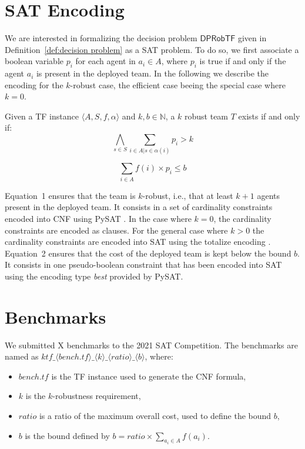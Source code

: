 \documentclass[conference]{IEEEtran}
\newcommand{\dprobtf}{\ensuremath{\mathsf{DPRobTF}}}
\theoremstyle{definition}
\begin{document}
\section{SAT Encoding}

We are interested in formalizing the decision problem \dprobtf{} given in Definition~\ref{def:decision problem}
as a SAT problem.
To do so, we first associate a boolean 
variable $p_i$ for each agent in $a_i \in A$, where $p_i$ is true
if and only if the agent $a_i$ is present in the deployed team.
In the following we describe the encoding for the $k$-robust case, the efficient
case beeing the special case where $k=0$.

Given a TF instance $\langle A, S, f, \alpha\rangle$ and $k, b \in \mathbb{N}$, 
a $k$ robust team $T$ exists if and only if:
\begin{equation}
\bigwedge_{s \in S} \sum_{i \in A | s \in \alpha(i)} p_i > k
\end{equation}

\begin{equation}
\sum_{i \in A} f(i) \times p_i \leq b
\end{equation}

Equation~1 ensures that the team is $k$-robust, i.e., that at least $k + 1$ agents present in the deployed team.
It consists in a set of cardinality constraints encoded into CNF using PySAT \cite{imms-sat18}.
In the case where $k = 0$, the cardinality constraints are encoded as clauses. 
For the general case where $k > 0$ the cardinality constraints are encoded into SAT using
the totalize encoding \cite{BailleuxB03}.
Equation~2 ensures that the cost of the deployed team is kept below the bound $b$.
It consists in one pseudo-boolean constraint
that has been encoded into SAT using the encoding type \textit{best} provided by PySAT.

\section{Benchmarks}

We submitted X benchmarks to the 2021 SAT Competition.
The benchmarks are named as $ktf\_\langle bench.tf \rangle \_\langle k \rangle\_\langle ratio \rangle\_\langle b\rangle$, where:
\begin{itemize}
	\item $bench.tf$ is the TF instance used to generate the CNF formula,
	\item $k$ is the $k$-robustness requirement,
	\item $ratio$ is a ratio of the maximum overall cost, used to define the bound $b$,
	\item $b$ is the bound defined by $b = ratio \times \sum_{a_i \in A} f(a_i)$.
\end{itemize}
\end{document}
